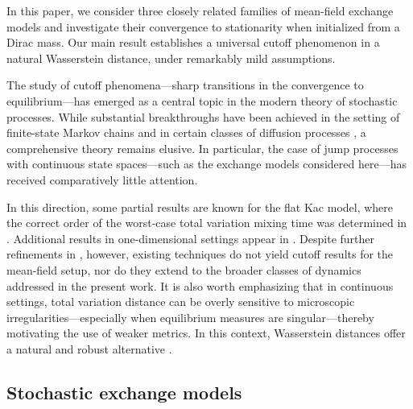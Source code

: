\documentclass[11pt,reqno]{amsart}
\theoremstyle{remark}
\theoremstyle{definition}
\numberwithin{equation}{section}
\numberwithin{figure}{section}
\begin{document}
In this paper, we consider three closely related families of mean-field exchange models and investigate their convergence to stationarity when initialized from a Dirac mass. Our main result establishes a universal cutoff phenomenon in a natural Wasserstein distance, under remarkably mild assumptions. 


The study of cutoff phenomena---sharp transitions in the convergence to equilibrium---has emerged as a central topic in the modern theory of stochastic processes. While substantial breakthroughs have been achieved in the setting of finite-state Markov chains and in certain classes of diffusion processes \cite{lubetzky2010cutoff,lacoin2016mixing,bordenave_cutoff2019,salez_cutoff_2024, salez2025cutoff}, a comprehensive theory remains elusive. In particular, the case of jump processes with continuous state spaces---such as the exchange models considered here---has received comparatively little attention.

In this direction, some partial results are known for the flat Kac model, where the correct order of the worst-case total variation mixing time was determined in \cite{smith_gibbs_2014}. Additional results in one-dimensional settings appear in \cite{randall_winkler_mixing_2005, caputo_mixing_2019,labbe_petit_hydrodynamic_2025}. Despite further refinements in \cite{pillai_smith_kac_2017, pillai_smith_mixing_2018}, however, existing techniques do not yield cutoff results for the mean-field setup, nor do they extend to the broader classes of dynamics addressed in the present work. It is also worth emphasizing that in continuous settings, total variation distance can be overly sensitive to microscopic irregularities---especially when equilibrium measures are singular---thereby motivating the use of weaker metrics. In this context, Wasserstein distances offer a natural and robust alternative \cite{aldous_lecture_2012, banerjee2020rates, quattropani2021mixing, oliveira_convergence_2009}.		


\subsection{Stochastic exchange models}
		
\end{document}
